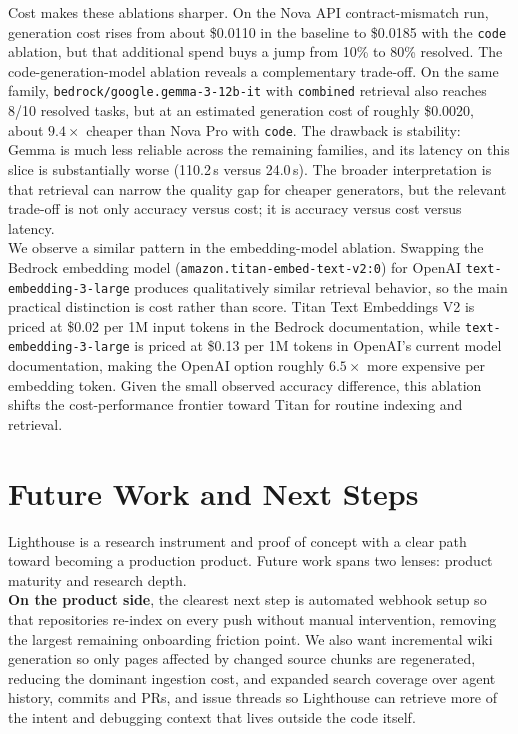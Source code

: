 \documentclass[a4paper,12pt]{article}
\begin{document}
Cost makes these ablations sharper. On the Nova API contract-mismatch run, generation cost rises from about \$0.0110 in the baseline to \$0.0185 with the \texttt{code} ablation, but that additional spend buys a jump from 10\% to 80\% resolved. The code-generation-model ablation reveals a complementary trade-off. On the same family, \texttt{bedrock/google.gemma-3-12b-it} with \texttt{combined} retrieval also reaches 8/10 resolved tasks, but at an estimated generation cost of roughly \$0.0020, about \(9.4\times\) cheaper than Nova Pro with \texttt{code}. The drawback is stability: Gemma is much less reliable across the remaining families, and its latency on this slice is substantially worse (110.2\,s versus 24.0\,s). The broader interpretation is that retrieval can narrow the quality gap for cheaper generators, but the relevant trade-off is not only accuracy versus cost; it is accuracy versus cost versus latency.\\

We observe a similar pattern in the embedding-model ablation. Swapping the Bedrock embedding model (\texttt{amazon.titan-embed-text-v2:0}) for OpenAI \texttt{text-embedding-3-large} produces qualitatively similar retrieval behavior, so the main practical distinction is cost rather than score. Titan Text Embeddings V2 is priced at \$0.02 per 1M input tokens in the Bedrock documentation, while \texttt{text-embedding-3-large} is priced at \$0.13 per 1M tokens in OpenAI's current model documentation, making the OpenAI option roughly \(6.5\times\) more expensive per embedding token. Given the small observed accuracy difference, this ablation shifts the cost-performance frontier toward Titan for routine indexing and retrieval.\\






\section{Future Work and Next Steps}
\label{sec:future}

Lighthouse is a research instrument and proof of concept with a clear path
toward becoming a production product.
Future work spans two lenses: product maturity and research depth.\\

\textbf{On the product side}, the clearest next step is automated webhook setup so that
repositories re-index on every push without manual intervention, removing the
largest remaining onboarding friction point. We also want incremental wiki
generation so only pages affected by changed source chunks are regenerated,
reducing the dominant ingestion cost, and expanded search coverage over agent
history, commits and PRs, and issue threads so Lighthouse can retrieve more of
the intent and debugging context that lives outside the code itself.\\
\end{document}
